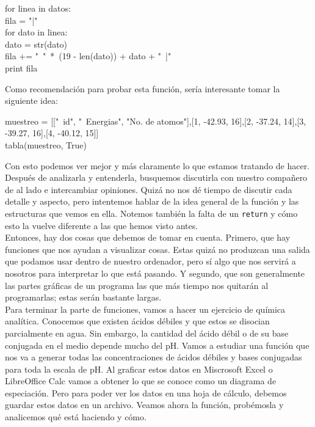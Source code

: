 \documentclass[10pt,letterpaper]{article}
\newcommand{\inlinecode}[1]{
\colorbox{light-gray}{\texttt{#1}}
}
\newenvironment{Code}
{
\begin{lrbox}{\selvestebox}%
\begin{minipage}{\dimexpr\columnwidth-2\fboxsep\relax}
\fontfamily{\ttdefault}\selectfont
}
{\end{minipage}\end{lrbox}%
\begin{center}
\colorbox{light-gray}{\usebox{\selvestebox}}
\end{center}
}
\begin{document}
\begin{small}
\begin{Code}
\hspace*{4mm} for linea in datos:\\
\hspace*{11mm} fila = "|"\\
\hspace*{11mm} for dato in linea:\\
\hspace*{18mm} dato = str(dato)\\
\hspace*{18mm} fila += "\ "\ *\ (19 - len(dato)) + dato + "\ |"\\
\hspace*{11mm} print fila
\end{Code}
\end{small}

\newpage

Como recomendaci\'on para probar esta funci\'on, ser\'ia interesante tomar la siguiente idea:

\begin{Code}
muestreo = [["\ \hspace*{-2mm}id", "\ \hspace*{-2mm}Energias", "No. de atomos"],[1, -42.93, 16],[2, -37.24, 14],[3, -39.27, 16],[4, -40.12, 15]]\\
tabla(muestreo, True)
\end{Code}

Con esto podemos ver mejor y m\'as claramente lo que estamos tratando de hacer. Despu\'es de analizarla y entenderla, busquemos discutirla con nuestro compa\~nero de al lado e intercambiar opiniones. Quiz\'a no nos d\'e tiempo de discutir cada detalle y aspecto, pero intentemos hablar de la idea general de la funci\'on y las estructuras que vemos en ella. Notemos tambi\'en la falta de un \inlinecode{return} y c\'omo esto la vuelve diferente a las que hemos visto antes.\\

Entonces, hay dos cosas que debemos de tomar en cuenta. Primero, que hay funciones que nos ayudan a visualizar cosas. Estas quiz\'a no produzcan una salida que podamos usar dentro de nuestro ordenador, pero s\'i algo que nos servir\'a a nosotros para interpretar lo que est\'a pasando. Y segundo, que son generalmente las partes gr\'aficas de un programa las que m\'as tiempo nos quitar\'an al programarlas; estas ser\'an bastante largas.\\

Para terminar la parte de funciones, vamos a hacer un ejercicio de qu\'imica anal\'itica. Conocemos que existen \'acidos d\'ebiles y que estos se disocian parcialmente en agua. Sin embargo, la cantidad del \'acido d\'ebil o de su base conjugada en el medio depende mucho del pH. Vamos a estudiar una funci\'on que nos va a generar todas las concentraciones de \'acidos d\'ebiles y bases conjugadas para toda la escala de pH. Al graficar estos datos en Miscrosoft Excel o LibreOffice Calc vamos a obtener lo que se conoce como un diagrama de especiaci\'on. Pero para poder ver los datos en una hoja de c\'alculo, debemos guardar estos datos en un archivo. Veamos ahora la funci\'on, prob\'emosla y analicemos qu\'e est\'a haciendo y c\'omo.
\end{document}
